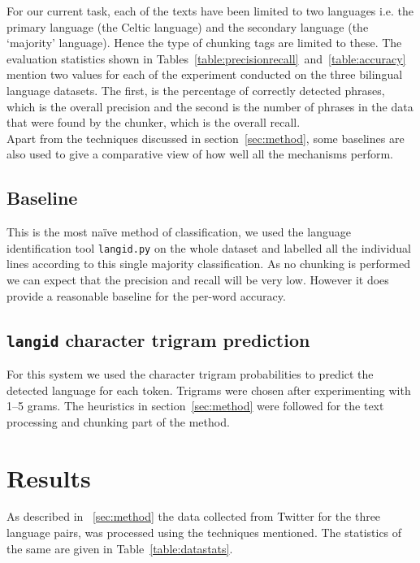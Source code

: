 \documentclass[11pt]{article}
\begin{document}
For our current task, each of the texts have been limited to two languages i.e. the primary language (the Celtic language) and the 
secondary language (the `majority' language). Hence the type of chunking tags are limited to these. The evaluation statistics shown 
in Tables~\ref{table:precisionrecall}~and~\ref{table:accuracy} mention two values for each of the experiment conducted on the three bilingual 
language datasets. The first, is the percentage of correctly detected phrases, which is the overall precision and the second is the 
number of phrases in the data that were found by the chunker, which is the overall recall. \\

Apart from the techniques discussed in section~\ref{sec:method}, some baselines are also used to give a comparative view of how well all the mechanisms perform.

\subsection{Baseline}
\label{baseline}

This is the most na\"{i}ve method of classification, we used the language identification tool \texttt{langid.py} \cite{lui2012langid} on the whole dataset and labelled all the individual lines according to this single majority classification. As no chunking is performed we can expect that the precision and recall will be very low. However it does provide a reasonable baseline for the per-word accuracy.  

\subsection{\texttt{langid} character trigram prediction}
\label{langidstuff}


For this system we used the character trigram probabilities to predict the detected language for each token. Trigrams were chosen after experimenting with 1--5 grams. The heuristics in section~\ref{sec:method} were followed for the text processing and chunking part of the method.

\section{Results}
\label{sec:results}
As described in ~\ref{sec:method} the data collected from Twitter for the three language pairs, was processed using the techniques mentioned. The statistics of the same are given in Table~\ref{table:datastats}. 
\end{document}
